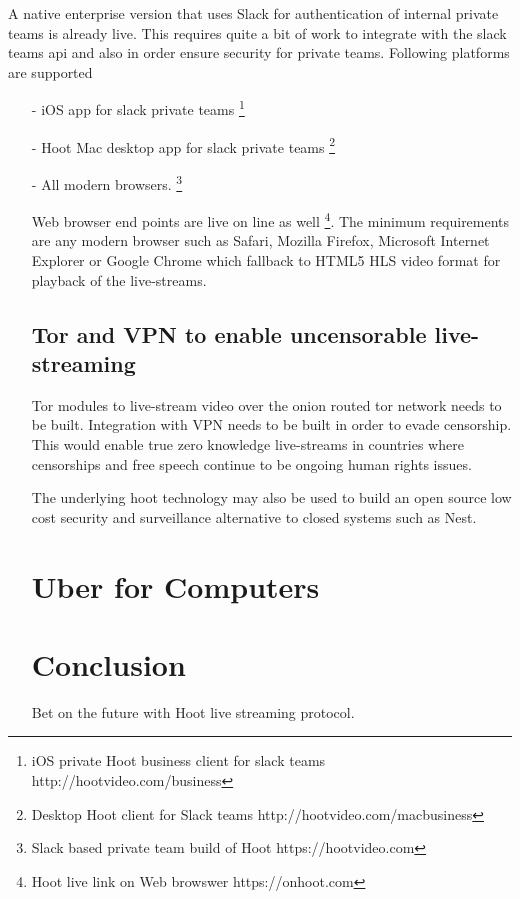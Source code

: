 \documentclass{article}
\begin{document}
A native enterprise version that uses Slack for authentication of
internal private teams is already live.
 This requires quite a bit of work to integrate with the slack teams api and also in order  ensure security for private teams. Following platforms are supported
\begin{itemize}

\item[-]iOS app for slack private teams \footnote{ iOS private Hoot business client for slack teams http://hootvideo.com/business}
\item[-]Hoot Mac desktop app for slack private teams \footnote{Desktop Hoot client for Slack teams http://hootvideo.com/macbusiness}
\item[-]All modern browsers. \footnote{Slack based private team build of Hoot https://hootvideo.com}

Web browser end points are live on line as well
\footnote{Hoot live link on Web browswer https://onhoot.com}. The minimum requirements are any modern
browser such as Safari, Mozilla Firefox, Microsoft Internet Explorer
or Google Chrome which fallback to HTML5 HLS video format for playback
of the live-streams.


\subsection{Tor and VPN to enable uncensorable live-streaming }
Tor modules to live-stream video over the onion routed tor network needs
to be built. Integration with VPN needs to be built in order to evade censorship. This would enable true zero knowledge live-streams in
countries where censorships and free speech continue to be ongoing
human rights issues.

The underlying hoot technology may also be used to build an open
source low cost security and surveillance alternative to closed systems
such as Nest.


\section{Uber for Computers}

\section{Conclusion}
Bet on the future with Hoot live streaming protocol.

\newpage



\end{itemize}
\end{document}
